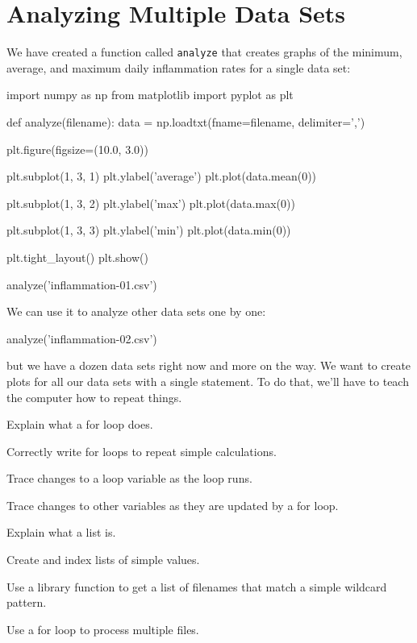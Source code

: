 \documentclass{book}
\begin{document}
\section{Analyzing Multiple Data Sets}

We have created a function called \texttt{analyze} that creates graphs
of the minimum, average, and maximum daily inflammation rates for a
single data set:

\begin{VerbIn}
import numpy as np
from matplotlib import pyplot as plt

def analyze(filename):
    data = np.loadtxt(fname=filename, delimiter=',')

    plt.figure(figsize=(10.0, 3.0))

    plt.subplot(1, 3, 1)
    plt.ylabel('average')
    plt.plot(data.mean(0))

    plt.subplot(1, 3, 2)
    plt.ylabel('max')
    plt.plot(data.max(0))

    plt.subplot(1, 3, 3)
    plt.ylabel('min')
    plt.plot(data.min(0))

    plt.tight_layout()
    plt.show()

analyze('inflammation-01.csv')
\end{VerbIn}


We can use it to analyze other data sets one by one:

\begin{VerbIn}
analyze('inflammation-02.csv')
\end{VerbIn}


but we have a dozen data sets right now and more on the way. We want to
create plots for all our data sets with a single statement. To do that,
we'll have to teach the computer how to repeat things.

\begin{objectives}
\begin{swcitemize}
\item
  Explain what a for loop does.
\item
  Correctly write for loops to repeat simple calculations.
\item
  Trace changes to a loop variable as the loop runs.
\item
  Trace changes to other variables as they are updated by a for loop.
\item
  Explain what a list is.
\item
  Create and index lists of simple values.
\item
  Use a library function to get a list of filenames that match a simple
  wildcard pattern.
\item
  Use a for loop to process multiple files.
\end{swcitemize}
\end{objectives}
\end{document}
